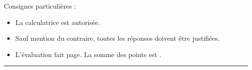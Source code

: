 
\usepackage{minted}

\SetDate[31/03/2026]
\reversemarginpar
\setlength{\marginparsep}{.5cm}


\pagestyle{fancy}
\fancyhead[R]{\today}

\null\vspace{-20pt}
Consignes particulières : 
\begin{itemize}[label=$\bullet$]
	\item 
	La calculatrice est {autorisée}.
	\item
	Sauf mention du contraire, toutes les réponses doivent être justifiées.
	\item
	L'évaluation fait \pageref{lastpage} page. La somme des points est .
\end{itemize}

\marginpar{[pts]}
\hrule



